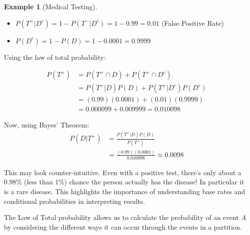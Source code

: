 \documentclass[
  letterpaper,
]{scrbook}
\providecommand{\tightlist}{%
  \setlength{\itemsep}{0pt}\setlength{\parskip}{0pt}}
\theoremstyle{definition}
\theoremstyle{plain}
\theoremstyle{plain}
\theoremstyle{definition}
\newtheorem{example}{Example}[chapter]
\theoremstyle{remark}
\begin{document}
\begin{tcolorbox}
\begin{example}[Medical
Testing]
\begin{itemize}
\tightlist
\item
  \(P(T^+|D^c) = 1 - P(T^-|D^c) = 1 - 0.99 = 0.01\) (False Positive
  Rate)
\item
  \(P(D^c) = 1 - P(D) = 1 - 0.0001 = 0.9999\)
\end{itemize}

Using the law of total probability:

\[
\begin{aligned}
P(T^+) &=P(T^+ \cap D)+P(T^+\cap D^c)\\
& =P(T^+|D)P(D) + P(T^+|D^c)P(D^c)\\
&= (0.99)(0.0001) + (0.01)(0.9999)\\
&= 0.000099 + 0.009999 = 0.010098
\end{aligned}
\]

Now, using Bayes' Theorem: \[
\begin{aligned}
P(D|T^+) &= \frac{P(T^+|D) P(D)}{P(T^+)} \\
&=   \frac{(0.99)(0.0001)}{0.010098} \approx 0.0098
\end{aligned}
\]

This may look counter-intuitive. Even with a positive test, there's only
about a 0.98\% (less than 1\%) chance the person actually has the
disease! In particular it is a rare disease. This highlights the
importance of understanding base rates and conditional probabilities in
interpreting results.

\end{example}

\end{tcolorbox}

The Law of Total probability allows us to calculate the probability of
an event \(A\) by considering the different ways it can occur through
the events in a partition.
\end{document}
